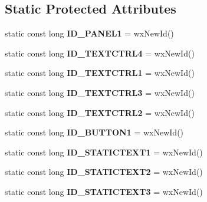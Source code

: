 \subsection*{Static Protected Attributes}
\begin{DoxyCompactItemize}
\item 
\hypertarget{class_new_file_a11038cae655dfcb441991ffad187114e}{static const long {\bfseries I\+D\+\_\+\+P\+A\+N\+E\+L1} = wx\+New\+Id()}\label{class_new_file_a11038cae655dfcb441991ffad187114e}

\item 
\hypertarget{class_new_file_a3464cf15024fb9e49571d24d9b2d0d40}{static const long {\bfseries I\+D\+\_\+\+T\+E\+X\+T\+C\+T\+R\+L4} = wx\+New\+Id()}\label{class_new_file_a3464cf15024fb9e49571d24d9b2d0d40}

\item 
\hypertarget{class_new_file_a1125c518d89dbec295e46240a53bf016}{static const long {\bfseries I\+D\+\_\+\+T\+E\+X\+T\+C\+T\+R\+L1} = wx\+New\+Id()}\label{class_new_file_a1125c518d89dbec295e46240a53bf016}

\item 
\hypertarget{class_new_file_aeee3c478ec5cca687c3c111db5f5b0ff}{static const long {\bfseries I\+D\+\_\+\+T\+E\+X\+T\+C\+T\+R\+L3} = wx\+New\+Id()}\label{class_new_file_aeee3c478ec5cca687c3c111db5f5b0ff}

\item 
\hypertarget{class_new_file_a43a3a036cfb63e625ce85b8d70e0b0ab}{static const long {\bfseries I\+D\+\_\+\+T\+E\+X\+T\+C\+T\+R\+L2} = wx\+New\+Id()}\label{class_new_file_a43a3a036cfb63e625ce85b8d70e0b0ab}

\item 
\hypertarget{class_new_file_a49617943e524eb0a5fa7e156c19f2b29}{static const long {\bfseries I\+D\+\_\+\+B\+U\+T\+T\+O\+N1} = wx\+New\+Id()}\label{class_new_file_a49617943e524eb0a5fa7e156c19f2b29}

\item 
\hypertarget{class_new_file_a680b314362e4c8d2f76a51e66c9b3b27}{static const long {\bfseries I\+D\+\_\+\+S\+T\+A\+T\+I\+C\+T\+E\+X\+T1} = wx\+New\+Id()}\label{class_new_file_a680b314362e4c8d2f76a51e66c9b3b27}

\item 
\hypertarget{class_new_file_a76f89e881f24da2e1789df6626b1e081}{static const long {\bfseries I\+D\+\_\+\+S\+T\+A\+T\+I\+C\+T\+E\+X\+T2} = wx\+New\+Id()}\label{class_new_file_a76f89e881f24da2e1789df6626b1e081}

\item 
\hypertarget{class_new_file_a41404774e082603f292e133b7e7d4449}{static const long {\bfseries I\+D\+\_\+\+S\+T\+A\+T\+I\+C\+T\+E\+X\+T3} = wx\+New\+Id()}\label{class_new_file_a41404774e082603f292e133b7e7d4449}


\end{DoxyCompactItemize}
